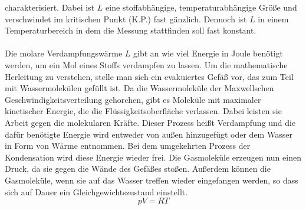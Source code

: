 charakterisiert. Dabei ist $L$ eine stoffabhängige, temperaturabhängige Größe und verschwindet im kritischen Punkt (K.P.) fast gänzlich. Dennoch ist $L$ in einem Temperaturbereich 
in dem die Messung stattfinden soll fast konstant.\\
\\
Die molare Verdampfungswärme $L$ gibt an wie viel Energie in Joule benötigt werden, um ein Mol eines Stoffs verdampfen zu lassen. Um die mathematische Herleitung zu verstehen, stelle
man sich ein evakuiertes Gefäß vor, das zum Teil mit Wassermolekülen gefüllt ist. Da die Wassermoleküle der Maxwellschen Geschwindigkeitsverteilung gehorchen, gibt es Moleküle
mit maximaler kinetischer Energie, die die Flüssigkeitsoberfläche verlassen. Dabei leisten sie Arbeit gegen die molekularen Kräfte. Dieser Prozess
heißt Verdampfung und die dafür benötigte Energie wird entweder von außen hinzugefügt oder dem Wasser in Form von Wärme entnommen. Bei dem umgekehrten Prozess der Kondensation wird
diese Energie wieder frei. Die Gasmoleküle erzeugen nun einen Druck, da sie gegen die Wände des Gefäßes stoßen. Außerdem können die Gasmoleküle, wenn sie auf das Wasser treffen 
wieder eingefangen werden, so dass sich auf Dauer ein Gleichgewichtszustand einstellt.
\begin{equation}
    \label{eqn:allgGasgl}
    pV = RT
\end{equation}

\cite{sample}
